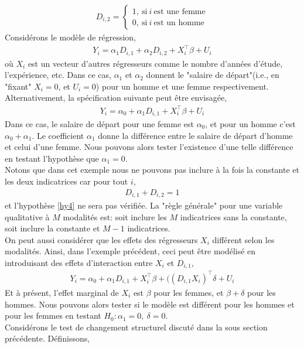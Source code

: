 \begin{align*}
D_{i, 2} = \left\{
\begin{array}{c}
1, \  \textrm{si} \  i  \ \textrm{est une femme}\\
0, \  \textrm{si} \  i  \ \textrm{est un homme}
\end{array}
\right.
\end{align*}
Considérons le modèle de régression,
\begin{align*}
Y_i  = \alpha_1D_{i,1}+\alpha_2D_{i, 2} + X_i^\top\beta + U_i
\end{align*}
où $X_i$ est un vecteur d'autres régresseurs comme le nombre d'années d'étude, l'expérience, etc. Dans ce cas, $\alpha_1$ et $\alpha_2$ donnent le "salaire de départ"(i.e., en "fixant" $X_i=0$, et $U_i = 0$) pour un homme et une femme respectivement. Alternativement, la spécification suivante peut être envisagée,
\begin{align*}
Y_i = \alpha_0 + \alpha_1D_{i, 1} + X_i^\top\beta + U_i
\end{align*}
Dans ce cas, le salaire de départ pour une femme est $\alpha_0$, et pour un homme c'est $\alpha_0+\alpha_1$. Le coefficient $\alpha_1$ donne la différence entre le salaire de départ d'homme et celui d'une femme. Nous pouvons alors tester l'existence d'une telle différence en testant l'hypothèse que $\alpha_1 = 0$.\\
Notons que dans cet exemple nous ne pouvons pas inclure à la fois la constante et les deux indicatrices car pour tout $i$,
\begin{align*}
D_{i, 1}+D_{i, 2} = 1
\end{align*}
et l'hypothèse \ref{hy4} ne sera pas vérifiée. La "règle générale" pour une variable qualitative à $M$ modalités est: soit inclure les $M$ indicatrices sans la constante, soit inclure la constante et $M-1$ indicatrices.\\
On peut aussi considérer que les effets des régresseurs $X_i$ différent selon les modalités. Ainsi, dans l'exemple précédent, ceci peut être modélisé en introduisant des effets d'interaction entre $X_i$ et $D_{i, 1}$,
\begin{align*}
Y_i = \alpha_0 + \alpha_1D_{i, 1} + X_i^\top\beta + ((D_{i, 1}X_i)^\top\delta + U_i
\end{align*} 
Et à présent, l'effet marginal de $X_i$ est $\beta$ pour les femmes, et $\beta+\delta$ pour les hommes. Nous pouvons alors tester si le modèle est différent pour les hommes et pour les femmes en testant $H_0: \alpha_1 = 0, \ \delta = 0$.\\
Considérons le test de changement structurel discuté dans la sous section précédente. Définissons,

